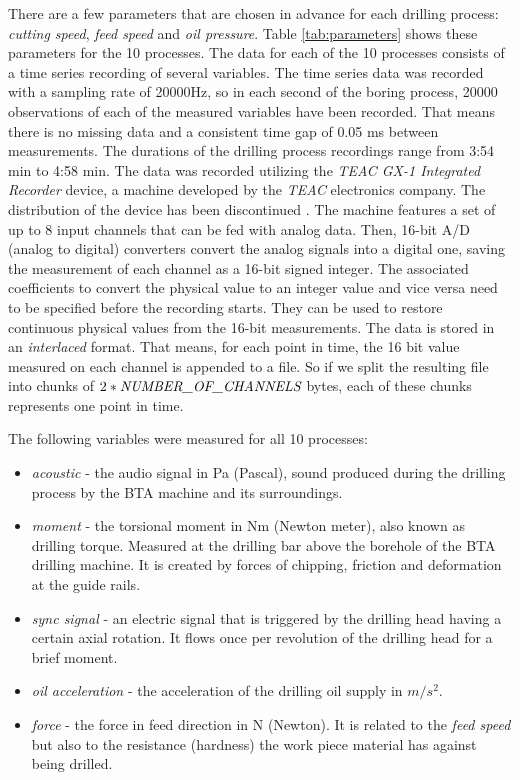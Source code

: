 \documentclass[12 pt]{scrartcl}
\begin{document}
There are a few parameters that are chosen in advance for each drilling process: \emph{cutting speed}, \emph{feed speed} and \emph{oil pressure}. Table \ref{tab:parameters} shows these parameters for the 10 processes.
The data for each of the 10 processes consists of a time series recording of several variables.
The time series data was recorded with a sampling rate of 20000Hz, so in each second of the boring process, 20000 observations of each of the measured variables have been recorded. That means there is no missing data and a consistent time gap of 0.05 ms between measurements. The durations of the drilling process recordings range from 3:54 min to 4:58 min.
The data was recorded utilizing the \emph{TEAC GX-1 Integrated Recorder} device, a machine developed by the \emph{TEAC} electronics company. The distribution of the device has been discontinued \citep{DAQLOGTEAC}. The machine features a set of up to 8 input channels that can be fed with analog data. Then, 16-bit A/D (analog to digital) converters convert the analog signals into a digital one, saving the measurement of each channel as a 16-bit signed integer.
The associated coefficients to convert the physical value to an integer value and vice versa need to be specified before the recording starts. They can be used to restore continuous physical values from the 16-bit measurements. The data is stored in an \emph{interlaced} format. That means, for each point in time, the 16 bit value measured on each channel is appended to a file. So if we split the resulting file into chunks of $2*\emph{NUMBER\_OF\_CHANNELS}$ bytes, each of these chunks represents one point in time.

The following variables were measured for all 10 processes:
\begin{itemize}
  \item \emph{acoustic} - the audio signal in Pa (Pascal), sound produced during the drilling process by the BTA machine and its surroundings.
  \item \emph{moment} - the torsional moment in Nm (Newton meter), also known as drilling torque. Measured at the drilling bar above the borehole of the BTA drilling machine. It is created by forces of chipping, friction and deformation at the guide rails.
  \item \emph{sync signal} - an electric signal that is triggered by the drilling head having a certain axial rotation. It flows once per revolution of the drilling head for a brief moment.
  \item \emph{oil acceleration} - the acceleration of the drilling oil supply in $m/s^2$.
  \item \emph{force} - the force in feed direction in N (Newton). It is related to the \emph{feed speed} but also to the resistance (hardness) the work piece material has against being drilled.
\end{itemize}
\end{document}
